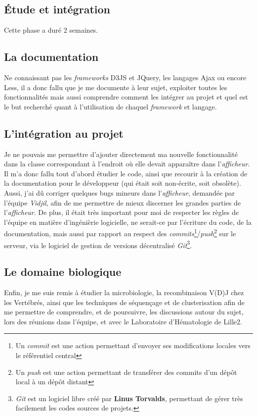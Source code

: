 \documentclass[12pt]{report}
\begin{document}
\begin{spacing}{1.2}
\section{Étude et intégration}

Cette phase a duré 2 semaines.

\subsection{La documentation}
Ne connaissant pas les \textit{frameworks} D3JS et JQuery, les langages Ajax ou encore Less, il a donc fallu que je me documente à leur sujet, exploiter toutes les fonctionnalités mais aussi comprendre comment les intégrer au projet et quel est le but recherché quant à l'utilisation de chaquel \textit{framework} et langage.

\subsection{L'intégration au projet}
Je ne pouvais me permettre d'ajouter directement ma nouvelle fonctionnalité dans la classe correspondant à l'endroit où elle devait apparaître dans l'\textit{afficheur}. Il m'a donc fallu tout d'abord étudier le code, ainsi que recourir à la création de la documentation pour le développeur (qui était soit non-écrite, soit obsolète). Aussi, j'ai dû corriger quelques bugs mineurs dans l'\textit{afficheur}, demandée par l'équipe \textit{Vidjil}, afin de me permettre de mieux discerner les grandes parties de l'\textit{afficheur}.
\newline
De plus, il était très important pour moi de respecter les règles de l'équipe en matière d'ingénièrie logicielle, ne serait-ce par l'écriture du code, de la documentation, mais aussi par rapport au respect des \textit{commits}\footnote{Un \textit{commit} est une action permettant d'envoyer ses modifications locales vers le référentiel central}/\textit{push}\footnote{Un \textit{push} est une action permettant de transférer des commits d'un dépôt local à un dépôt distant} sur le serveur, via le logiciel de gestion de versions décentralisé \textit{Git}\footnote{\textit{Git} est un logiciel libre créé par \textbf{Linus Torvalds}, permettant de gérer très facilement les codes sources de projets.}.

\subsection{Le domaine biologique}
Enfin, je me suis remis à étudier la microbiologie, la recombinaison V(D)J chez les Vertébrés, ainsi que les techniques de séquençage et de clusterisation afin de me permettre de comprendre, et de poursuivre, les discussions autour du sujet, lors des réunions dans l'équipe, et avec le Laboratoire d'Hématologie de Lille2.


\end{spacing}
\end{document}
